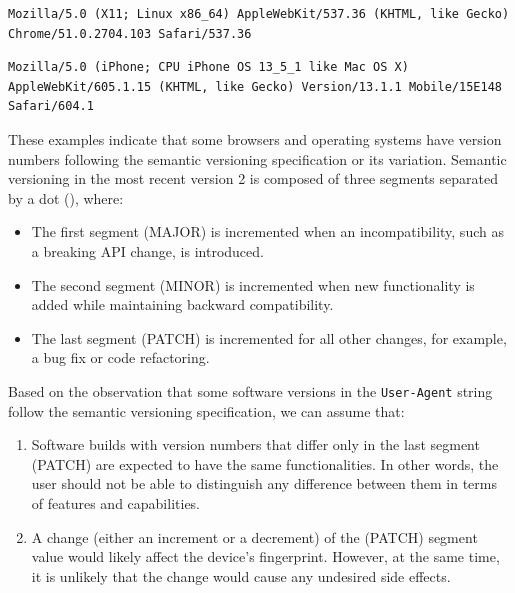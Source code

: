 \bigbreak

\begin{lstlisting}[caption={An example of Chrome User-Agent string \cite{MDNHeaderUserAgent}.}, label={Listing:UserAgentChrome}]
Mozilla/5.0 (X11; Linux x86_64) AppleWebKit/537.36 (KHTML, like Gecko) Chrome/51.0.2704.103 Safari/537.36
\end{lstlisting}

\begin{lstlisting}[caption={An example of Safari User-Agent string (mobile version) \cite{MDNHeaderUserAgent}.}, label={Listing:UserAgentSafari}]
Mozilla/5.0 (iPhone; CPU iPhone OS 13_5_1 like Mac OS X) AppleWebKit/605.1.15 (KHTML, like Gecko) Version/13.1.1 Mobile/15E148 Safari/604.1
\end{lstlisting}

\medbreak

These examples indicate that some browsers and operating systems have version numbers following the semantic versioning specification \cite{SemVerWebsite} or its variation. Semantic versioning in the most recent version 2 is composed of three segments separated by a dot (), where:

\begin{itemize}
	\item The first segment (MAJOR) is incremented when an incompatibility, such as a breaking API change, is introduced.
	\item The second segment (MINOR) is incremented when new functionality is added while maintaining backward compatibility.
	\item The last segment (PATCH) is incremented for all other changes, for example, a bug fix or code refactoring.
\end{itemize}

Based on the observation that some software versions in the \texttt{User-Agent} string follow the semantic versioning specification, we can assume that:

\begin{enumerate}
	\item Software builds with version numbers that differ only in the last segment (PATCH) are expected to have the same functionalities. In other words, the user should not be able to distinguish any difference between them in terms of features and capabilities.
	\item A change (either an increment or a decrement) of the (PATCH) segment value would likely affect the device's fingerprint. However, at the same time, it is unlikely that the change would cause any undesired side effects.
\end{enumerate}


